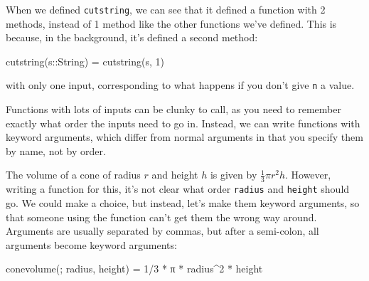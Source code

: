 \documentclass[
  letterpaper,
  DIV=11,
  numbers=noendperiod]{scrreprt}
\newenvironment{Shaded}{\begin{snugshade}}{\end{snugshade}}
\newcommand{\ConstantTok}[1]{\textcolor[rgb]{0.56,0.35,0.01}{#1}}
\newcommand{\DataTypeTok}[1]{\textcolor[rgb]{0.68,0.00,0.00}{#1}}
\newcommand{\FloatTok}[1]{\textcolor[rgb]{0.68,0.00,0.00}{#1}}
\newcommand{\FunctionTok}[1]{\textcolor[rgb]{0.28,0.35,0.67}{#1}}
\newcommand{\NormalTok}[1]{\textcolor[rgb]{0.00,0.23,0.31}{#1}}
\newcommand{\OperatorTok}[1]{\textcolor[rgb]{0.37,0.37,0.37}{#1}}
\begin{document}
\begin{tcolorbox}[enhanced jigsaw, toprule=.15mm, opacitybacktitle=0.6, leftrule=.75mm, breakable, coltitle=black, bottomrule=.15mm, colbacktitle=quarto-callout-note-color!10!white, bottomtitle=1mm, rightrule=.15mm, title=\textcolor{quarto-callout-note-color}{\faInfo}\hspace{0.5em}{Note}, colframe=quarto-callout-note-color-frame, left=2mm, colback=white, opacityback=0, arc=.35mm, toptitle=1mm, titlerule=0mm]

When we defined \texttt{cutstring}, we can see that it defined a
function with 2 methods, instead of 1 method like the other functions
we've defined. This is because, in the background, it's defined a second
method:

\begin{Shaded}
\begin{Highlighting}[]
\FunctionTok{cutstring}\NormalTok{(s}\OperatorTok{::}\DataTypeTok{String}\NormalTok{) }\OperatorTok{=} \FunctionTok{cutstring}\NormalTok{(s, }\FloatTok{1}\NormalTok{)}
\end{Highlighting}
\end{Shaded}

with only one input, corresponding to what happens if you don't give
\texttt{n} a value.

\end{tcolorbox}

Functions with lots of inputs can be clunky to call, as you need to
remember exactly what order the inputs need to go in. Instead, we can
write functions with keyword arguments, which differ from normal
arguments in that you specify them by name, not by order.

The volume of a cone of radius \(r\) and height \(h\) is given by
\(\frac{1}{3} \pi r^2 h\). However, writing a function for this, it's
not clear what order \texttt{radius} and \texttt{height} should go. We
could make a choice, but instead, let's make them keyword arguments, so
that someone using the function can't get them the wrong way around.
Arguments are usually separated by commas, but after a semi-colon, all
arguments become keyword arguments:

\begin{Shaded}
\begin{Highlighting}[]
\FunctionTok{conevolume}\NormalTok{(; radius, height) }\OperatorTok{=} \FloatTok{1}\OperatorTok{/}\FloatTok{3} \OperatorTok{*} \ConstantTok{π} \OperatorTok{*}\NormalTok{ radius}\OperatorTok{\^{}}\FloatTok{2} \OperatorTok{*}\NormalTok{ height}
\end{Highlighting}
\end{Shaded}
\end{document}
